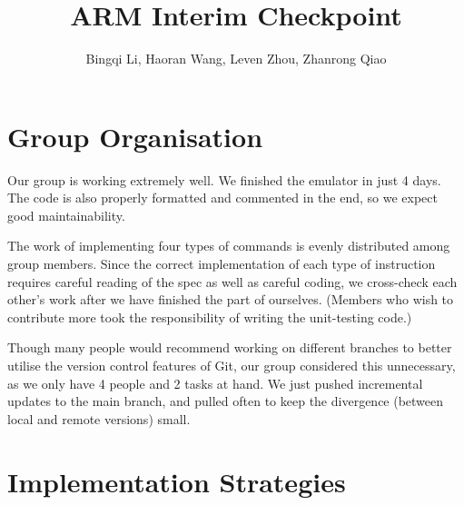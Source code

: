 \documentclass[11pt]{article}
\begin{document}
\title{ARM Interim Checkpoint}
\author{Bingqi Li, Haoran Wang, Leven Zhou, Zhanrong Qiao}

\maketitle

\section{Group Organisation}

Our group is working extremely well. We finished the emulator in just 4 days. The code is also properly formatted and commented in the end, so we expect good maintainability.

The work of implementing four types of commands is evenly distributed among group members. Since the correct implementation of each type of instruction requires careful reading of the spec as well as careful coding, we cross-check each other’s work after we have finished the part of ourselves. (Members who wish to contribute more took the responsibility of writing the unit-testing code.)

Though many people would recommend working on different branches to better utilise the version control features of Git, our group considered this unnecessary, as we only have 4 people and 2 tasks at hand. We just pushed incremental updates to the main branch, and pulled often to keep the divergence (between local and remote versions) small.

\section{Implementation Strategies}
\end{document}
